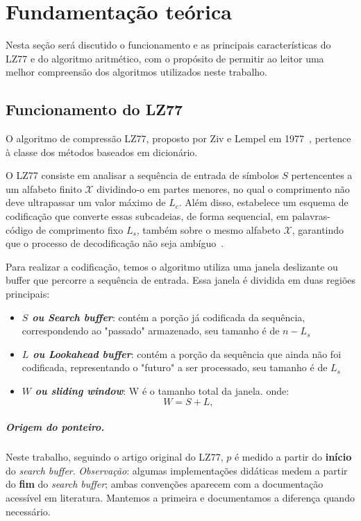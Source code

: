 \chapter{Fundamentação teórica}\label{cap:revisao}

Nesta seção será discutido o funcionamento e as principais características do
LZ77 e do algoritmo aritmético, com o propósito de permitir ao leitor uma
melhor compreensão dos algoritmos utilizados neste trabalho.

\section{Funcionamento do LZ77}\label{sec:LZ77}

O algoritmo de compressão LZ77, proposto por Ziv e Lempel em
1977~\cite{1055714}, pertence à classe dos métodos baseados em dicionário.

O LZ77 consiste em analisar a sequência de entrada de símbolos $S$ pertencentes a um alfabeto finito
$\mathcal{X}$ dividindo-o em partes menores, no qual o comprimento não deve ultrapassar
um valor máximo de $L_{c}$. Além disso, estabelece um esquema de codificação que converte essas subcadeias, 
de forma sequencial, em palavras-código de comprimento fixo $L_{s}$, também sobre o mesmo alfabeto $\mathcal{X}$, garantindo que o processo de decodificação não seja ambíguo~\cite{1055714}.

Para realizar a codificação, temos o algoritmo utiliza uma janela deslizante ou buffer que
percorre a sequência de entrada. Essa janela é dividida em duas regiões
principais:

\begin{itemize}
  \item \textbf{\textit{$S$ ou Search buffer}}: contém a porção já codificada da sequência, correspondendo ao "passado" armazenado, seu tamanho é de $n - L_{s}$
  \item \textbf{\textit{$L$ ou Lookahead buffer}}: contém a porção da sequência que ainda não foi codificada, representando o "futuro" a ser processado, seu tamanho é de $L_{s}$
  \item \textbf{\textit{$W$ ou sliding window}}:  W é o tamanho total da janela. onde:
\[
    W = S + L,
\]
\end{itemize}

\paragraph*{Origem do ponteiro.}
Neste trabalho, seguindo o artigo original do LZ77, \(p\) é medido a partir do \textbf{início} do \emph{search buffer}. \emph{Observação}: algumas implementações didáticas medem a partir do \textbf{fim} do \emph{search buffer}; ambas convenções aparecem com a documentação acessível em \url{} literatura. Mantemos a primeira e documentamos a diferença quando necessário.


